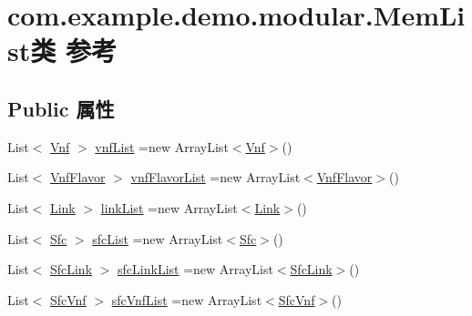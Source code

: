 \hypertarget{classcom_1_1example_1_1demo_1_1modular_1_1_mem_list}{}\section{com.\+example.\+demo.\+modular.\+Mem\+List类 参考}
\label{classcom_1_1example_1_1demo_1_1modular_1_1_mem_list}
\subsection*{Public 属性}
\begin{DoxyCompactItemize}
\item 
List$<$ \mbox{\hyperlink{classcom_1_1example_1_1demo_1_1modular_1_1_vnf}{Vnf}} $>$ \mbox{\hyperlink{classcom_1_1example_1_1demo_1_1modular_1_1_mem_list_ab447dbd3827648f735254d931c999da8}{vnf\+List}} =new Array\+List$<$\mbox{\hyperlink{classcom_1_1example_1_1demo_1_1modular_1_1_vnf}{Vnf}}$>$()
\item 
List$<$ \mbox{\hyperlink{classcom_1_1example_1_1demo_1_1modular_1_1_vnf_flavor}{Vnf\+Flavor}} $>$ \mbox{\hyperlink{classcom_1_1example_1_1demo_1_1modular_1_1_mem_list_a782b19767df77701d4664086e32b6dd7}{vnf\+Flavor\+List}} =new Array\+List$<$\mbox{\hyperlink{classcom_1_1example_1_1demo_1_1modular_1_1_vnf_flavor}{Vnf\+Flavor}}$>$()
\item 
List$<$ \mbox{\hyperlink{classcom_1_1example_1_1demo_1_1modular_1_1_link}{Link}} $>$ \mbox{\hyperlink{classcom_1_1example_1_1demo_1_1modular_1_1_mem_list_aea4f9c8a9fc260d44cb522004b839dfd}{link\+List}} =new Array\+List$<$\mbox{\hyperlink{classcom_1_1example_1_1demo_1_1modular_1_1_link}{Link}}$>$()
\item 
List$<$ \mbox{\hyperlink{classcom_1_1example_1_1demo_1_1modular_1_1_sfc}{Sfc}} $>$ \mbox{\hyperlink{classcom_1_1example_1_1demo_1_1modular_1_1_mem_list_a553e215ef17eda79fd89f4928b814e13}{sfc\+List}} =new Array\+List$<$\mbox{\hyperlink{classcom_1_1example_1_1demo_1_1modular_1_1_sfc}{Sfc}}$>$()
\item 
List$<$ \mbox{\hyperlink{classcom_1_1example_1_1demo_1_1modular_1_1_sfc_link}{Sfc\+Link}} $>$ \mbox{\hyperlink{classcom_1_1example_1_1demo_1_1modular_1_1_mem_list_a69092deb8e063eea06a8934546868d4c}{sfc\+Link\+List}} =new Array\+List$<$\mbox{\hyperlink{classcom_1_1example_1_1demo_1_1modular_1_1_sfc_link}{Sfc\+Link}}$>$()
\item 
List$<$ \mbox{\hyperlink{classcom_1_1example_1_1demo_1_1modular_1_1_sfc_vnf}{Sfc\+Vnf}} $>$ \mbox{\hyperlink{classcom_1_1example_1_1demo_1_1modular_1_1_mem_list_a35aea707dfed2a695ea09a2b027b7d2e}{sfc\+Vnf\+List}} =new Array\+List$<$\mbox{\hyperlink{classcom_1_1example_1_1demo_1_1modular_1_1_sfc_vnf}{Sfc\+Vnf}}$>$()

\end{DoxyCompactItemize}
